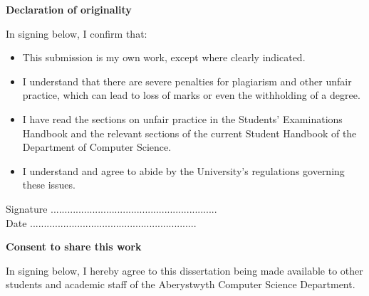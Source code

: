 \thispagestyle{empty}

\begin{center}
    {\LARGE\bf Declaration of originality}
\end{center}

In signing below, I confirm that:

\begin{itemize}
\item{This submission is my own work, except where clearly
indicated.  }

\item{I understand that there are severe penalties for plagiarism 
and other unfair practice, which can lead to loss of marks
or even the withholding of a degree. }
 
\item{I have read the sections on unfair practice in the Students' 
Examinations Handbook and the relevant sections of the 
current Student Handbook of the Department of Computer 
Science.}
 
\item{I understand and agree to abide by the University's
regulations governing these issues.}
\end{itemize}

\vspace{3em}
Signature ............................................................  \\

\vspace{1em}
Date ............................................................ \\

\vspace{3em}
\begin{center}
    {\LARGE\bf Consent to share this work}
\end{center}

In signing below, I hereby agree to this dissertation being made available to other
students and academic staff of the Aberystwyth Computer Science Department.  

